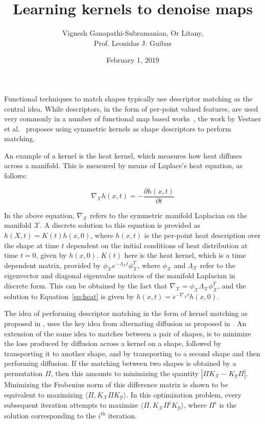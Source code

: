 \documentclass{article}
\title{Learning kernels to denoise maps}
\author{Vignesh Ganapathi-Subramanian, Or Litany, \\ Prof. Leonidas J. Guibas}
\date{February 1, 2019}
\begin{document}
\maketitle

Functional techniques to match shapes typically use descriptor matching as the central idea. While descriptors, in the form of per-point valued features, are used very commonly in a number of functional map based works~\cite{ovsjanikov2012functional}, the work by Vestner et al.~\cite{vestner2017efficient} proposes using symmetric kernels as shape descriptors to perform matching. 

An example of a kernel is the heat kernel, which measures how heat diffuses across a manifold. This is measured by means of Laplace's heat equation, as follows: 

\begin{equation}
    \nabla_\mathcal{X} h(x,t) = -\frac{\partial h(x,t)}{\partial t}
    \label{eq:heat}
\end{equation}

In the above equation, $\nabla_\mathcal{X}$ refers to the symmetric manifold Laplacian on the manifold $\mathcal{X}$. A discrete solution to this equation is provided as $h(X,t) = K(t)h(x,0)$, where $h(x,t)$ is the per-point heat description over the shape at time $t$ dependent on the initial conditions of heat distribution at time $t=0$, given by $h(x,0)$. $K(t)$ here is the heat kernel, which is a time dependent matrix, provided by $\phi_\mathcal{X}e^{-\Lambda_\mathcal{X} t}\phi_\mathcal{X}^T$, where $\phi_\mathcal{X}$ and $\Lambda_\mathcal{X}$ refer to the eigenvector and diagonal eigenvalue matrices of the manifold Laplacian in discrete form. This can be obtained by the fact that $\nabla_\mathcal{X} = \phi_\mathcal{X}\Lambda_\mathcal{X}\phi_\mathcal{X}^T$, and the solution to Equation~\ref{eq:heat} is given by $h(x,t) = e^{-\nabla_\mathcal{X} t}h(x,0)$. 

The idea of performing descriptor matching in the form of kernel matching as proposed in \cite{vestner2017efficient}, uses the key idea from alternating diffusion as proposed in \cite{lederman2014common}. An extension of the same idea to matches between a pair of shapes, is to minimize the loss produced by diffusion across a kernel on a shape, followed by transporting it to another shape, and by transporting to a second shape and then performing diffusion. If the matching between two shapes is obtained by a permutation $\Pi$, then this amounts to minimizing the quantity $|\Pi K_\mathcal{X} - K_\mathcal{Y} \Pi|$. Minimizing the Frobenius norm of this difference matrix is shown to be equivalent to maximizing $\langle \Pi, K_\mathcal{X}\Pi K_\mathcal{Y}\rangle$. In this optimization problem, every subsequent iteration attempts to maximize $\langle \Pi, K_\mathcal{X}\Pi^i K_\mathcal{Y}\rangle$, where $\Pi^i$ is the solution corresponding to the $i^{\text{th}}$ iteration.
\end{document}
